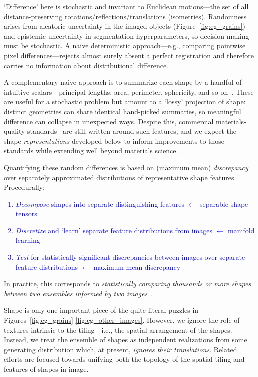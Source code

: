 \documentclass[pdflatex,iicol]{sn-jnl}%
\theoremstyle{thmstyleone}%
\theoremstyle{thmstyletwo}%
\theoremstyle{thmstylethree}%
\begin{document}
`Difference' here is stochastic and invariant to Euclidean motions---the set of all distance-preserving rotations/reflections/translations (isometries). Randomness arises from aleatoric uncertainty in the imaged objects (Figure~\ref{fig:eg_grains}) and epistemic uncertainty in segmentation hyperparameters, so decision-making must be stochastic. A naive deterministic approach---e.g., comparing pointwise pixel differences---rejects almost surely absent a perfect registration and therefore carries no information about distributional difference.

A complementary naive approach is to summarize each shape by a handful of intuitive scalars---principal lengths, area, perimeter, sphericity, and so on~\cite{stoudt2020location, ASTM_E562, ASTM_E930, ASTM_E112}. These are useful for a stochastic problem but amount to a `lossy' projection of shape: distinct geometries can share identical hand-picked summaries, so meaningful difference can collapse in unexpected ways. Despite this, commercial materials-quality standards~\cite{kazakov2019astm} are still written around such features, and we expect the shape \textit{representations} developed below to inform improvements to those standards while extending well beyond materials science.

Quantifying these random differences is based on (maximum mean) \emph{discrepancy}~\cite{gretton2012kernel} over separately approximated distributions of representative shape features. Procedurally:
\textcolor{blue}{\begin{enumerate}[label=\roman*)]
    \item \textit{Decompose} shapes into separate distinguishing features $\leftarrow$ separable shape tensors
    \item \textit{Discretize} and `learn' separate feature distributions from images $\leftarrow$ manifold learning
    \item \textit{Test} for statistically significant discrepancies between images over separate feature distributions $\leftarrow$ maximum mean discrepancy
\end{enumerate}}
In practice, this corresponds to \emph{statistically comparing thousands or more shapes between two ensembles informed by two images}~\cite{gretton2012kernel}.

Shape is only one important piece of the quite literal puzzles in Figures~\ref{fig:eg_grains}-\ref{fig:eg_other_images}. However, we ignore the role of textures intrinsic to the tiling---i.e., the spatial arrangement of the shapes. Instead, we treat the ensemble of shapes as independent realizations from some generating distribution which, at present, \textit{ignores their translations}. Related efforts are focused towards unifying both the topology of the spatial tiling and features of shapes in image.
\end{document}
